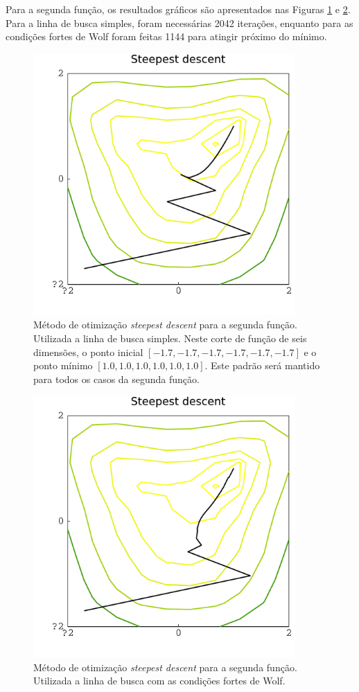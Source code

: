 \documentclass[12pt]{article}
\begin{document}
Para a segunda função, os resultados gráficos são apresentados nas Figuras \ref{fig:steep1} e \ref{fig:steep3}. Para a linha de busca simples, foram necessárias 2042 iterações, enquanto para as condições fortes de Wolf foram feitas 1144 para atingir próximo do mínimo. 
\begin{figure}[ht!]
	\centering
	\includegraphics[width=10cm]{Figuras/Steepest_descent_linef1}
	\caption{Método de otimização \textit{steepest descent} para a segunda função. Utilizada a linha de busca simples. Neste corte de função de seis	dimensões, o ponto inicial $[-1.7, -1.7, -1.7, -1.7, -1.7, -1.7]$ e o ponto mínimo $[1.0, 1.0, 1.0, 1.0, 1.0, 1.0]$. Este padrão será mantido para todos os casos da segunda função.} 
	\label{fig:steep1}
\end{figure} 
\begin{figure}[ht!]
	\centering
	\includegraphics[width=10cm]{Figuras/Steepest_descent_strongf1}
	\caption{Método de otimização \textit{steepest descent} para a segunda função. Utilizada a linha de busca com as condições fortes de Wolf.}
	\label{fig:steep3}
\end{figure}
\end{document}
